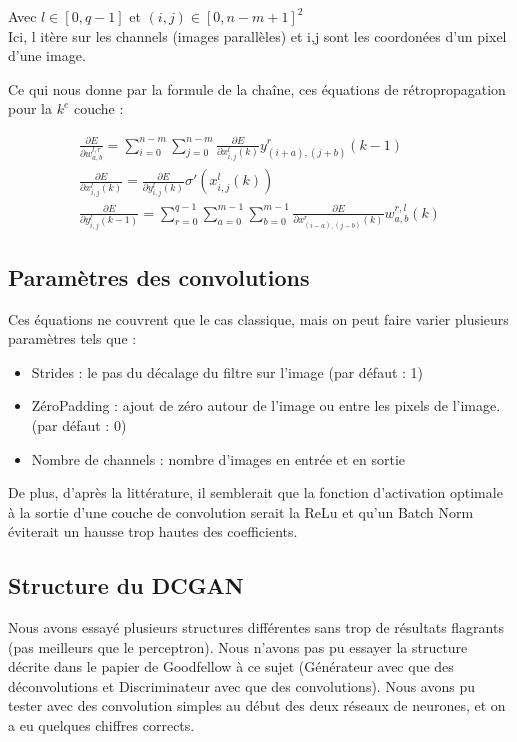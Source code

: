Avec $l\in [0, q-1]$ et $(i,j)\in [0, n-m+1]^2$ \\
Ici, l itère sur les channels (images parallèles) et i,j sont les coordonées d'un pixel d'une image.

Ce qui nous donne par la formule de la chaîne, ces équations de rétropropagation pour la $k^{e}$ couche :

\begin{equation} 
\begin{aligned}
\frac{\partial E}{\partial w_{a,b}^{l,r}} = \sum^{n-m}_{i=0}{\sum^{n-m}_{j=0}{\frac{\partial E}{\partial x^{l}_{i,j}(k)}y^{r}_{(i+a),(j+b)}(k-1)}} \\ 
\frac{\partial E}{\partial x_{i,j}^{l}(k)} = \frac{\partial E}{\partial y_{i,j}^{l}(k)}\sigma ' (x^{l}_{i,j}(k)) \\
\frac{\partial E}{\partial y_{i,j}^{l}(k-1)} = \sum^{q-1}_{r=0}\sum^{m-1}_{a=0}{\sum^{m-1}_{b=0}{\frac{\partial E}{\partial x^{r}_{(i-a),(j-b)}(k)}w^{r,l}_{a,b}(k)}} 
\end{aligned}
\end{equation} 

\subsection{Paramètres des convolutions}
Ces équations ne couvrent que le cas classique, mais on peut faire varier plusieurs paramètres tels que : 
\begin{itemize}
\item Strides : le pas du décalage du filtre sur l'image (par défaut : 1)
\item ZéroPadding : ajout de zéro autour de l'image ou entre les pixels de l'image. (par défaut : 0)
\item Nombre de channels : nombre d'images en entrée et en sortie
\end{itemize}
De plus, d'après la littérature, il semblerait que la fonction d'activation optimale à la sortie d'une couche de convolution serait la ReLu et qu'un Batch Norm éviterait un hausse trop hautes des coefficients.

\subsection{Structure du DCGAN}
Nous avons essayé plusieurs structures différentes sans trop de résultats flagrants (pas meilleurs que le perceptron). Nous n'avons pas pu essayer la structure décrite dans le papier de Goodfellow à ce sujet (Générateur avec que des déconvolutions et Discriminateur avec que des convolutions). Nous avons pu tester avec des convolution simples au début des deux réseaux de neurones, et on a eu quelques chiffres corrects.

